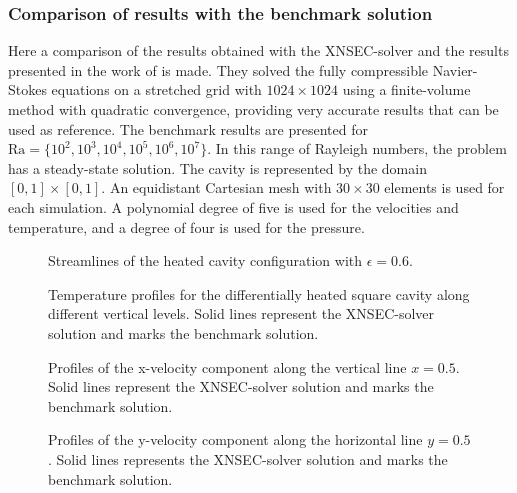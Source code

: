 \subsubsection{Comparison of results with the benchmark solution}

Here a comparison of the results obtained with the XNSEC-solver and the results presented in the work of \cite{vierendeelsBenchmarkSolutionsNatural2003} is made. They solved the fully compressible Navier-Stokes equations on a stretched grid with $1024\times1024$ using a finite-volume method with quadratic convergence, providing very accurate results that can be used as reference.
The benchmark results are presented for $\text{Ra} = \{10^2,10^3,10^4,10^5,10^6,10^7\}$. In this range of Rayleigh numbers, the problem has a steady-state solution. 
The cavity is represented by the domain $[0,1]\times[0,1]$. An equidistant Cartesian mesh with $30 \times 30$ elements is used for each simulation. A polynomial degree of five is used for the velocities and temperature, and a degree of four is used for the pressure.
%
\begin{figure}
	\centering
	\pgfplotsset{width=0.3 \textwidth, compat=1.3}
	\caption{Streamlines of the heated cavity configuration with $\epsilon = 0.6$.}\label{fig:HSCStreamlines}
\end{figure}

\begin{figure}[h]
	\centering
	\pgfplotsset{width=0.22\textwidth, compat=1.3} 
	\caption{Temperature profiles for the differentially heated square cavity along different vertical levels. Solid lines represent the XNSEC-solver solution and marks the benchmark solution.}
	\label{fig:TempProfile}
\end{figure}
%
\begin{figure}[h]
	\centering
	\pgfplotsset{width=0.22\textwidth, compat=1.3}
	\caption{Profiles of the x-velocity component along the vertical line $x=0.5$. Solid lines represent the XNSEC-solver solution and marks the benchmark solution.}
	\label{fig:VelocityXProfile}
\end{figure}
%
\begin{figure}[h]
	\centering
	\pgfplotsset{width=0.22\textwidth, compat=1.3}
	\caption{Profiles of the y-velocity component along the horizontal line $y=0.5$. Solid lines represents the XNSEC-solver solution and marks the benchmark solution.}
	\label{fig:VelocityYProfile}
\end{figure}


